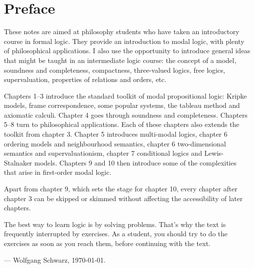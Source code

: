 \chapter*{Preface}\label{ch:preface}

These notes are aimed at philosophy students who have taken an introductory
course in formal logic. They provide an introduction to modal logic, with plenty
of philosophical applications. I also use the opportunity to introduce general
ideas that might be taught in an intermediate logic course: the concept of a
model, soundness and completeness, compactness, three-valued logics, free
logics, supervaluation, properties of relations and orders, etc.

Chapters 1--3 introduce the standard toolkit of modal propositional logic:
Kripke models, frame correspondence, some popular systems, the tableau method
and axiomatic calculi. Chapter 4 goes through soundness and completeness.
Chapters 5--8 turn to philosophical applications. Each of these chapters also
extends the toolkit from chapter 3. Chapter 5 introduces multi-modal logics,
chapter 6 ordering models and neighbourhood semantics, chapter 6 two-dimensional
semantics and supervaluationism, chapter 7 conditional logics and
Lewis-Stalnaker models. Chapters 9 and 10 then introduce some of the
complexities that arise in first-order modal logic.

Apart from chapter 9, which sets the stage for chapter 10, every chapter after
chapter 3 can be skipped or skimmed without affecting the accessibility of later
chapters.

The best way to learn logic is by solving problems. That's why the text is
frequently interrupted by exercises. As a student, you should try to do the
exercises as soon as you reach them, before continuing with the text.

\bigskip
--- Wolfgang Schwarz, \today.







